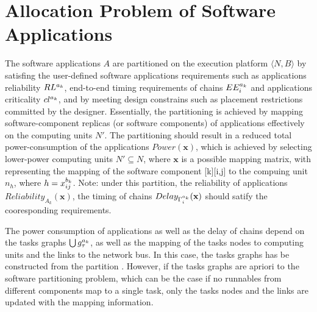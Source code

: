 \section{Allocation Problem of Software Applications}\label{sec_problem}
The software applications $A$ are partitioned on the execution platform $\langle N,B\rangle$ by satisfing the user-defined software applications requirements such as applications reliability $\ssp{RL}$, end-to-end timing requirements of chains $\sss{EE}$ and applications criticality $\ssp{cl}$, and by meeting design constrains such as placement restrictions committed by the designer. Essentially, the partitioning is achieved by mapping software-component replicas (or software components) of applications effectively on the computing units $N'$. The partitioning should result in a reduced total power-consumption of the applications $Power(\textbf{x})$, which is achieved by selecting lower-power computing units $N'\subseteq N$, where $\textbf{x}$ is a possible mapping matrix, with \ttxkij representing the mapping of the software component [k][i,j] to the compuing unit $n_h$, where $h=x^{b_k}_{ij}$.  Note: under this partition, the reliability of applications $Reliability_{A_k}(\textbf{x})$, the timing of chains $Delay_{\sss{\Gamma}}(\textbf{x})$ should satify the cooresponding requirements. 

The power consumption of applications as well as the delay of chains depend on the tasks graphs $\bigcup\sss{g}[k][\tau]$, as well as the mapping of the tasks nodes to computing units and the links to the network bus. In this case, the tasks graphs has be constructed from the partition \ttx. However, if the tasks graphs are apriori to the software partitioning problem,  which can be the case if no runnables from different components map to a single task, only the tasks nodes and the links are updated with the mapping information.

